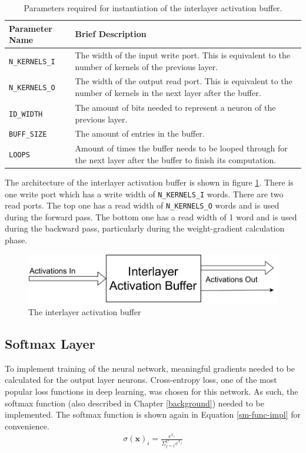\begin{table}
	\centering
	\begin{tabularx}{\textwidth}{|l| X|}
		\hline
		\textbf{Parameter Name}	& \textbf{Brief Description}\\\hline
		\texttt{N\_KERNELS\_I} & 
		The width of the input write port. This is equivalent to the number of kernels of the previous layer. \\\hline
		
		\texttt{N\_KERNELS\_O} & 
		The width of the output read port. This is equivalent to the number of kernels in the next layer after the buffer.\\\hline
		
		\texttt{ID\_WIDTH} &
		The amount of bits needed to represent a neuron of the previous layer.\\\hline 
		
		\texttt{BUFF\_SIZE} &
		The amount of entries in the buffer. \\\hline 
		
		\texttt{LOOPS} &
		Amount of times the buffer needs to be looped through for the next layer after the buffer to finish its computation.
		\\\hline
	\end{tabularx}	
	\caption{Parameters required for instantiation of the interlayer activation buffer.}
	\label{interlayer-arch-params}
\end{table}

The architecture of the interlayer activation buffer is shown in figure \ref{interlayer-arch}. There is one write port which has a write width of \texttt{N\_KERNELS\_I} words. There are two read ports. The top one has a read width of \texttt{N\_KERNELS\_O} words and is used during the forward pass. The bottom one has a read width of 1 word and is used during the backward pass, particularly during the weight-gradient calculation phase.
\begin{figure}
	\centering 
	\includegraphics[width=\textwidth]{figures/interlayer_buffer}
	\caption{The interlayer activation buffer}\label{interlayer-arch}
\end{figure}

\subsection{Softmax Layer}
To implement training of the neural network, meaningful gradients needed to be calculated for the output layer neurons. Cross-entropy loss, one of the most popular loss functions in deep learning, was chosen for this network. As such, the softmax function (also described in Chapter \ref{background}) needed to be implemented. The softmax function is shown again in Equation \ref{sm-func-impl} for convenience.
\begin{align}
\sigma(\mathbf{x})_i = \frac{e^{x_i}}{\Sigma_{j=1}^C e^{x_j}} \label{sm-func-impl}
\end{align}

